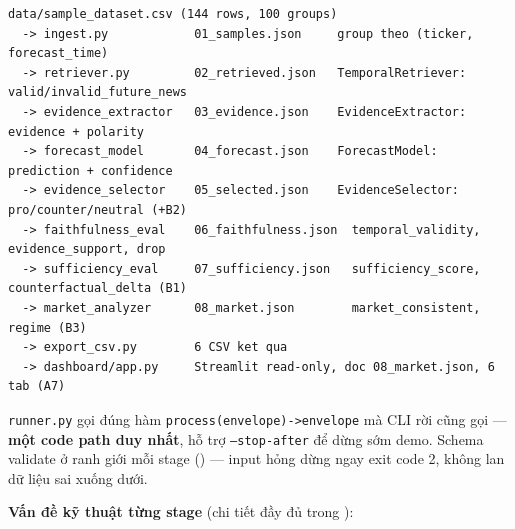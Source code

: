 \begin{singlespace}
\begin{lstlisting}[numbers=none]
data/sample_dataset.csv (144 rows, 100 groups)
  -> ingest.py            01_samples.json     group theo (ticker, forecast_time)
  -> retriever.py         02_retrieved.json   TemporalRetriever: valid/invalid_future_news
  -> evidence_extractor   03_evidence.json    EvidenceExtractor: evidence + polarity
  -> forecast_model       04_forecast.json    ForecastModel: prediction + confidence
  -> evidence_selector    05_selected.json    EvidenceSelector: pro/counter/neutral (+B2)
  -> faithfulness_eval    06_faithfulness.json  temporal_validity, evidence_support, drop
  -> sufficiency_eval     07_sufficiency.json   sufficiency_score, counterfactual_delta (B1)
  -> market_analyzer      08_market.json        market_consistent, regime (B3)
  -> export_csv.py        6 CSV ket qua
  -> dashboard/app.py     Streamlit read-only, doc 08_market.json, 6 tab (A7)
\end{lstlisting}
\end{singlespace}

\texttt{runner.py} gọi đúng hàm \texttt{process(envelope)->envelope} mà CLI rời cũng gọi — \textbf{một code path duy nhất}, hỗ trợ \texttt{--stop-after} để dừng sớm demo. Schema validate ở ranh giới mỗi stage () — input hỏng dừng ngay exit code 2, không lan dữ liệu sai xuống dưới.


\textbf{Vấn đề kỹ thuật từng stage} (chi tiết đầy đủ trong ):

